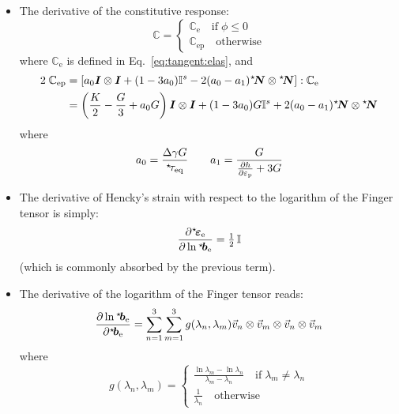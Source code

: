 \documentclass{goose-article}
\newcommand\ST[1]{\hspace*{-.3em}~^\star\!#1}
\newcommand\T[1]{\bm{{#1}}}
\newcommand\TT[1]{\mathbb{{#1}}}
\begin{document}
\begin{itemize}

    \item The derivative of the constitutive response:
    \begin{equation}
        \TT{C} =
        \begin{cases}
            \TT{C}_\mathrm{e} \quad\mathrm{if}\; \phi \leq 0 \\
            \TT{C}_\mathrm{ep} \quad\mathrm{otherwise}
        \end{cases}
    \end{equation}
    where $\TT{C}_\mathrm{e}$ is defined in Eq.~\eqref{eq:tangent:elas}, and
    \begin{align}
        2 \; \TT{C}_\mathrm{ep}
        &= \left[
            a_0 \T{I} \otimes \T{I}
            + (1 - 3 a_0) \TT{I}^s - 2 (a_0 - a_1) \ST{\T{N}} \otimes \ST{\T{N}}
        \right] : \TT{C}_\mathrm{e}
        \\
        &= \left( \frac{K}{2} - \frac{G}{3} + a_0 G \right) \T{I} \otimes \T{I}
        + (1 - 3 a_0) G \TT{I}^s + 2 (a_0 - a_1) \ST{\T{N}} \otimes \ST{\T{N}}
    \end{align}
    where
    \begin{equation}
        a_0 = \frac{\Delta \gamma G}{\ST{\tau}_\mathrm{eq}}
        \qquad
        a_1 = \frac{G}{\frac{\partial h}{\partial \varepsilon_\mathrm{p}} + 3 G}
    \end{equation}

    \item The derivative of Hencky’s strain with respect to the logarithm
    of the Finger tensor is simply:
    \begin{equation}
        \frac{\partial \ST{\T{\varepsilon}}_\mathrm{e}}{\partial \ln \ST{\T{b}}_\mathrm{e}}
        = \tfrac{1}{2} \, \TT{I}
    \end{equation}
    (which is commonly absorbed by the previous term).

    \item The derivative of the logarithm of the Finger tensor reads:
    \begin{equation}
        \frac{\partial \ln \ST{\T{b}}_\mathrm{e}}{\partial \ST{\T{b}}_\mathrm{e}}
        = \sum\limits_{n=1}^3 \sum\limits_{m=1}^3
        g(\lambda_n, \lambda_m) \vec{v}_n \otimes \vec{v}_m \otimes \vec{v}_n \otimes \vec{v}_m
    \end{equation}
    where
    \begin{equation}
        g(\lambda_n, \lambda_m) =
        \begin{cases}
            \displaystyle
            \frac{\ln \lambda_m - \ln \lambda_n}{\lambda_m - \lambda_n}
            \quad\mathrm{if}\; \lambda_m \neq \lambda_n \\
            \displaystyle \frac{1}{\lambda_n}
            \quad\mathrm{otherwise}
        \end{cases}
    \end{equation}


\end{itemize}
\end{document}
